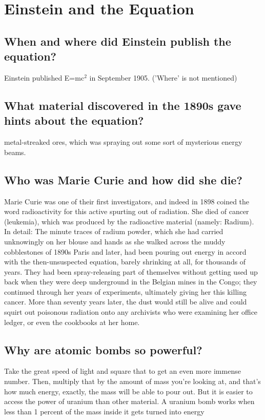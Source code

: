 %

\section{Einstein and the Equation}

\subsection*{When and where did Einstein publish the equation?}
Einstein published E=mc$^2$ in September 1905. ('Where' is not mentioned)

\subsection*{What material discovered in the 1890s gave hints about the equation?}
metal-streaked ores, which was spraying out some sort of mysterious energy beams.

\subsection*{Who was Marie Curie and how did she die?}
Marie Curie was one of their first investigators, and indeed in 1898 coined the word radioactivity for this active spurting out of radiation. She died of cancer (leukemia), which was produced by the radioactive material (namely: Radium).
In detail: The minute traces of radium powder, which she had carried unknowingly on her blouse and hands as she walked across the muddy cobblestones of 1890s Paris and later, had been pouring out energy in accord with the then-unsuspected equation, barely shrinking at all, for thousands of years. They had been spray-releasing part of themselves without getting used up back when they were deep underground in the Belgian mines in the Congo; they continued through her years of experiments, ultimately giving her this killing cancer. More than seventy years later, the dust would still be alive and could squirt out poisonous radiation onto any archivists who were examining her office ledger, or even the cookbooks at her home.

\subsection*{Why are atomic bombs so powerful?}
Take the great speed of light and square that to get an even more immense number. Then, multiply that by the amount of mass you're looking at, and that's how much energy, exactly, the mass will be able to pour out. But it is easier to access the power of uranium than other material. A uranium bomb works when less than 1 percent of the mass inside it gets turned into energy

